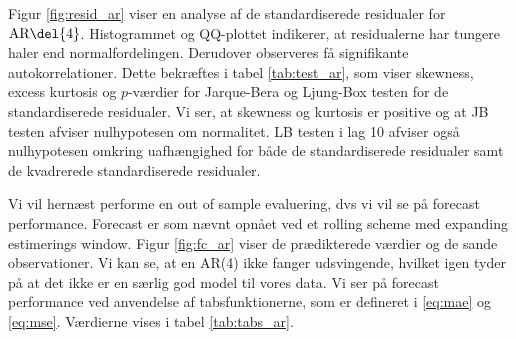 Figur \ref{fig:resid_ar} viser en analyse af de standardiserede residualer for \(\text{AR} \del{4}\). 
Histogrammet og QQ-plottet indikerer, at residualerne har tungere haler end normalfordelingen. 
Derudover observeres få signifikante autokorrelationer.
Dette bekræftes i tabel \ref{tab:test_ar}, som viser skewness, excess kurtosis og \(p\)-værdier for Jarque-Bera og Ljung-Box testen for de standardiserede residualer. 
Vi ser, at skewness og kurtosis er positive og at JB testen afviser nulhypotesen om normalitet. 
LB testen i lag 10 afviser også nulhypotesen omkring uafhængighed for både de standardiserede residualer samt de kvadrerede standardiserede residualer. 
%


Vi vil hernæst performe en out of sample evaluering, dvs vi vil se på forecast performance.
Forecast er som nævnt opnået ved et rolling scheme med expanding estimerings window. 
Figur \ref{fig:fc_ar} viser de prædikterede værdier og de sande observationer. Vi kan se, at en AR(4) ikke fanger udsvingende, hvilket igen tyder på at det ikke er en særlig god model til vores data. 
Vi ser på forecast performance ved anvendelse af tabsfunktionerne, som er defineret i \eqref{eq:mae} og \eqref{eq:mse}. Værdierne vises i tabel \ref{tab:tabs_ar}.  





%
%
%
%
%
%
%
%
% 
%
%





